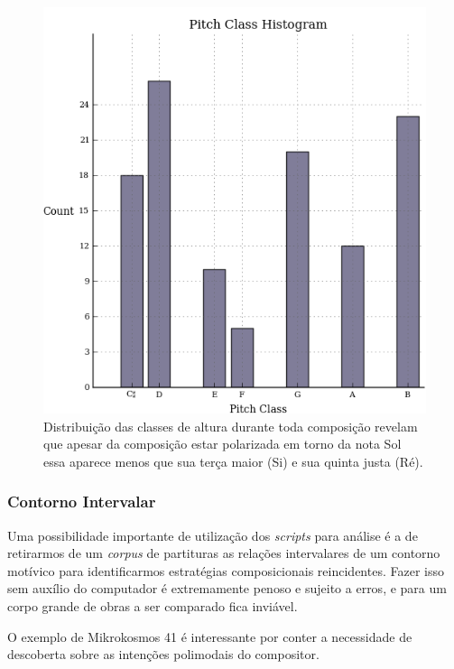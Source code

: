 \documentclass[
	12pt,				%
	openright,			%
	twoside,			%
	a4paper,			%
	english,			%
	french,				%
	spanish,			%
	brazil				%
	]{abntex2}
\begin{document}
\begin{figure}[!h]
	\caption{\label{fig_grafico} Distribuição das classes de altura durante toda composição revelam que apesar da composição estar polarizada em torno da nota Sol essa aparece menos que sua terça maior (Si) e sua quinta justa (Ré). } 
	\begin{center}
	    \includegraphics[scale=0.4]{estudosM21/mikro041Pclass.png}
	\end{center}
\end{figure}



\subsubsection{Contorno Intervalar}
\label{mikrocontorno}

Uma possibilidade importante de utilização dos \textit{scripts} para análise é a de retirarmos de um \textit{corpus} de partituras as relações intervalares de um contorno motívico para identificarmos estratégias composicionais reincidentes. Fazer isso sem auxílio do computador é extremamente penoso e sujeito a erros, e para um corpo grande de obras a ser comparado fica inviável.

O exemplo de Mikrokosmos 41 é interessante por conter a necessidade de descoberta sobre as intenções polimodais do compositor.
\end{document}
